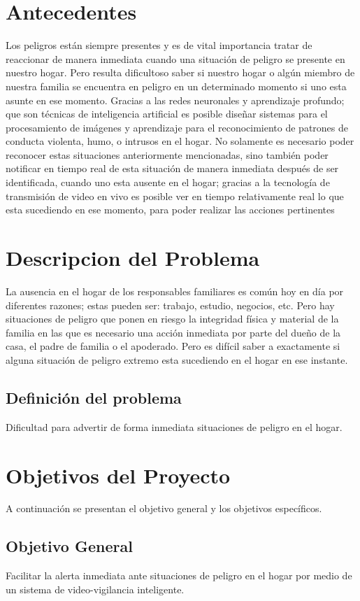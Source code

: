 \section{Antecedentes}
Los peligros están siempre presentes y es de vital importancia tratar de reaccionar de manera inmediata cuando una situación de peligro se presente en nuestro hogar. Pero resulta dificultoso saber si nuestro hogar o algún miembro de nuestra familia se encuentra en peligro en un determinado momento si uno esta asunte en ese momento.
Gracias a las redes neuronales y aprendizaje profundo; que son técnicas de inteligencia artificial es posible diseñar sistemas para el procesamiento de imágenes y aprendizaje para el reconocimiento de patrones de conducta violenta, humo, o intrusos en el hogar.
No solamente es necesario poder reconocer estas situaciones anteriormente mencionadas, sino también poder notificar en tiempo real de esta situación de manera inmediata después de ser identificada, cuando uno esta ausente en el hogar; gracias a la tecnología de transmisión de video en vivo es posible ver en tiempo relativamente real lo que esta sucediendo en ese momento, para poder realizar las acciones pertinentes

\section{Descripcion del Problema}
La ausencia en el hogar de los responsables familiares es común hoy en día por diferentes razones; 
estas pueden ser: trabajo, estudio, negocios, etc. 
Pero hay situaciones de peligro que ponen en riesgo la integridad física y material de la familia en las que es necesario una acción inmediata por parte del dueño de la casa, el padre de familia o el apoderado. Pero es difícil saber a exactamente si alguna situación de peligro extremo esta sucediendo en el hogar en ese instante.

\subsection{Definición del problema}
Dificultad para advertir de forma inmediata situaciones de peligro en el hogar.

\section{Objetivos del Proyecto}
A continuación se presentan el objetivo general y los objetivos específicos.

\subsection{Objetivo General}
Facilitar la alerta inmediata ante situaciones de peligro en el hogar por medio de un sistema de video-vigilancia inteligente.

